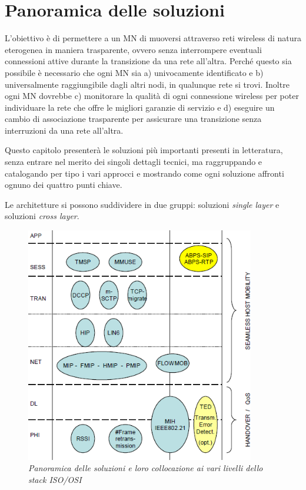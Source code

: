 \documentclass[12pt,a4paper,openright,twoside]{book}
\begin{document}
\clearpage{\pagestyle{empty}\cleardoublepage}

\chapter{Panoramica delle soluzioni}
\lhead[\fancyplain{}{\bfseries\thepage}]{\fancyplain{}{\bfseries\rightmark}}
L'obiettivo è di permettere a un MN di muoversi attraverso reti
wireless di natura eterogenea in maniera trasparente, ovvero senza
interrompere eventuali connessioni attive durante la transizione da
una rete all'altra. Perché questo sia possibile è necessario che ogni
MN sia a) univocamente identificato e b) universalmente raggiungibile
dagli altri nodi, in qualunque rete si trovi. Inoltre ogni MN dovrebbe
c) monitorare la qualità di ogni connessione wireless per poter
individuare la rete che offre le migliori garanzie di servizio e d)
eseguire un cambio di associazione trasparente per assicurare una
transizione senza interruzioni da una rete all'altra.

Questo capitolo presenterà le soluzioni più importanti presenti in
letteratura, senza entrare nel merito dei singoli dettagli tecnici, ma
raggruppando e catalogando per tipo i vari approcci e mostrando come
ogni soluzione affronti ognuno dei quattro punti chiave.

Le architetture si possono suddividere in due gruppi: soluzioni
\emph{single layer} e soluzioni \emph{cross layer}.

\begin{figure}[tb]
  \centering
  \includegraphics[width=10cm]{img/panoramica-soluzioni}
  \caption{\em Panoramica delle soluzioni e loro collocazione ai vari
    livelli dello stack ISO/OSI}
  \label{fig:panoramica}
\end{figure}
\end{document}
